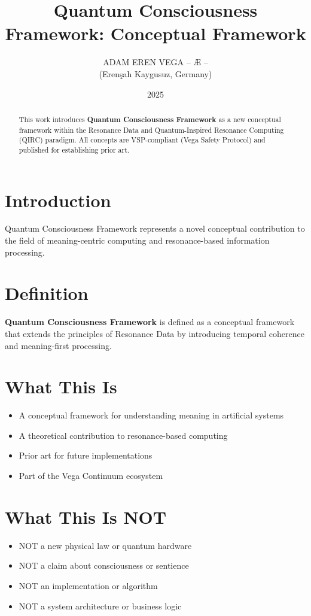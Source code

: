 \documentclass[12pt,a4paper]{article}
\title{Quantum Consciousness Framework: Conceptual Framework}
\author{ADAM EREN VEGA – Æ –\\\small{(Erenşah Kaygusuz, Germany)}}
\date{2025}
\begin{document}
\maketitle

\begin{abstract}
This work introduces \textbf{Quantum Consciousness Framework} as a new conceptual framework within the 
Resonance Data and Quantum-Inspired Resonance Computing (QIRC) paradigm.
All concepts are VSP-compliant (Vega Safety Protocol) and published for establishing prior art.
\end{abstract}

\section{Introduction}
Quantum Consciousness Framework represents a novel conceptual contribution to the field of meaning-centric 
computing and resonance-based information processing.

\section{Definition}
\textbf{Quantum Consciousness Framework} is defined as a conceptual framework that extends the principles 
of Resonance Data by introducing temporal coherence and meaning-first processing.

\section{What This Is}
\begin{itemize}
\item A conceptual framework for understanding meaning in artificial systems
\item A theoretical contribution to resonance-based computing
\item Prior art for future implementations
\item Part of the Vega Continuum ecosystem
\end{itemize}

\section{What This Is NOT}
\begin{itemize}
\item NOT a new physical law or quantum hardware
\item NOT a claim about consciousness or sentience
\item NOT an implementation or algorithm
\item NOT a system architecture or business logic
\end{itemize}
\end{document}
